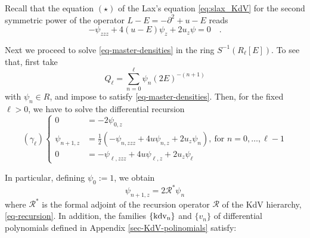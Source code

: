 \documentclass[a4paper,12pt]{article}
\newcommand{\cR}{\mathcal{R}}
\def\kdv{\rm kdv}
\begin{document}
 
 
Recall that the equation $(\star )$ of the Lax's equation \eqref{eq:slax_KdV} for the second symmetric power of the operator $L-E =-\partial^2+u-E$ reads
 \begin{equation}\label{eq-master-densities}
-\psi_{zzz}+4 (u-E)\psi_z +2u_z \psi  =0 \quad .
\end{equation}

Next we proceed to solve \eqref{eq-master-densities} in the ring $S^{-1} ( R_\ell [E])$. To see that, first take 
\begin{equation}\label{P-ell}
Q_\ell = \sum_{n=0}^\ell \psi_n (2E)^{-(n+1)}    
\end{equation}
with $ \psi_n \in R$, and impose to satisfy \eqref{eq-master-densities}. Then, for the fixed $\ell >0$, we have to solve the differential recursion
\begin{equation} \label{recu-1}
 (\gamma_\ell )\left\{ \begin{array}{rl}
0&=-2 \psi_{0,z} \\
 \psi_{n+1,z}  &= \frac12 \left(-\psi_{n,zzz}+4 u\psi_{n,z} +2u_z \psi_n \right) , \  \textrm{for } n= 0, \dots , \ell -1 \\
0&=-\psi_{\ell,zzz}+4 u\psi_{\ell,z} +2u_z \psi_\ell 
\end{array}  
\right.
\end{equation}





In particular, defining $\psi_0 :=1$, we obtain $$\psi_{n+1,z} = 2\cR^* \psi_n$$ 
where $\cR^*$ is the formal adjoint  of the recursion operator $\cR$ of the KdV hierarchy, \eqref{eq-recursion}. In addition, the families $\{ \kdv_n \}$ and $\{ v_n \}$ of differential polynomials defined in Appendix \ref{sec-KdV-polinomials} satisfy:
\end{document}
